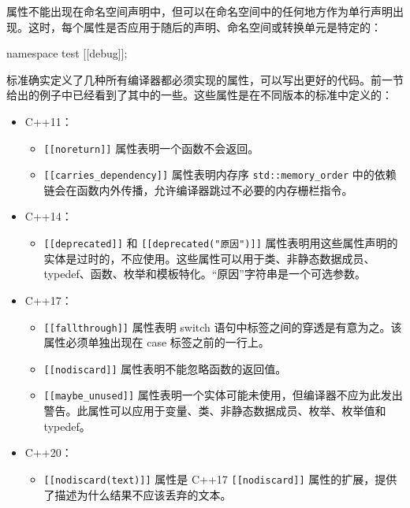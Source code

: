 属性不能出现在命名空间声明中，但可以在命名空间中的任何地方作为单行声明出现。这时，每个属性是否应用于随后的声明、命名空间或转换单元是特定的：

\begin{cpp}
namespace test
{
    [[debug]];
}
\end{cpp}

标准确实定义了几种所有编译器都必须实现的属性，可以写出更好的代码。前一节给出的例子中已经看到了其中的一些。这些属性是在不同版本的标准中定义的：

\begin{itemize}
\item
C++11：

\begin{itemize}
\item
\verb|[[noreturn]]| 属性表明一个函数不会返回。

\item
\verb|[[carries_dependency]]| 属性表明内存序 \verb|std::memory_order| 中的依赖链会在函数内外传播，允许编译器跳过不必要的内存栅栏指令。
\end{itemize}

\item
C++14：

\begin{itemize}
\item
\verb|[[deprecated]]| 和 \verb|[[deprecated("原因")]]| 属性表明用这些属性声明的实体是过时的，不应使用。这些属性可以用于类、非静态数据成员、typedef、函数、枚举和模板特化。“原因”字符串是一个可选参数。
\end{itemize}

\item
C++17：

\begin{itemize}
\item
\verb|[[fallthrough]]| 属性表明 switch 语句中标签之间的穿透是有意为之。该属性必须单独出现在 case 标签之前的一行上。

\item
\verb|[[nodiscard]]| 属性表明不能忽略函数的返回值。

\item
\verb|[[maybe_unused]]| 属性表明一个实体可能未使用，但编译器不应为此发出警告。此属性可以应用于变量、类、非静态数据成员、枚举、枚举值和 typedef。
\end{itemize}

\item
C++20：

\begin{itemize}
\item
\verb|[[nodiscard(text)]]| 属性是 C++17 \verb|[[nodiscard]]| 属性的扩展，提供了描述为什么结果不应该丢弃的文本。


\end{itemize}
\end{itemize}
